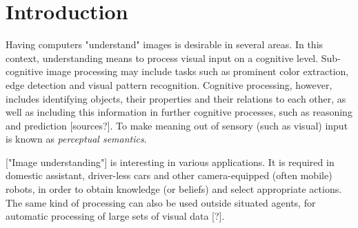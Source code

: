 \documentclass[11pt, a4paper]{article}
\begin{document}

\thispagestyle{empty}




\newpage

\begin{spacing}{0.0}
\glsresetall
\tableofcontents
\end{spacing}

\thispagestyle{empty}

\newpage
\setcounter{page}{1}

\glsresetall
\section{Introduction}
\label{sec:intro}

Having computers "understand" images is desirable in several areas.
In this context, understanding means to process visual input on a cognitive level.
Sub-cognitive image processing may include tasks such as prominent color extraction, edge detection and visual pattern recognition.
Cognitive processing, however, includes identifying objects, their properties and their relations to each other, as well as including this information in further cognitive processes, such as reasoning and prediction [sources?].
To make meaning out of sensory (such as visual) input is known as \textit{perceptual semantics}.

["Image understanding"] is interesting in various applications.
It is required in domestic assistant, driver-less cars and other camera-equipped (often mobile) robots, in order to obtain knowledge (or beliefs) and select appropriate actions.
The same kind of processing can also be used outside situated agents, for automatic processing of large sets of visual data [?].
\end{document}
